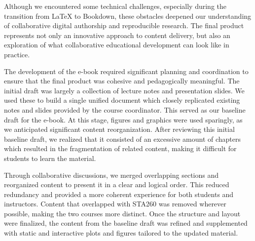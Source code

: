 \documentclass[11pt]{article}
\begin{document}
Although we encountered some technical challenges, especially during the transition from LaTeX to Bookdown, these obstacles deepened our understanding of collaborative digital authorship and reproducible research. The final product represents not only an innovative approach to content delivery, but also an exploration of what collaborative educational development can look like in practice.


The development of the e-book required significant planning and coordination to ensure that the final product was cohesive and pedagogically meaningful. The initial draft was largely a collection of lecture notes and presentation slides. 
We used these to build a single unified document which closely replicated existing notes and slides provided by the course coordinator.
This served as our baseline draft for the e-book.
At this stage, figures and graphics were used sparingly, as we anticipated significant content reorganization.
After reviewing this initial baseline draft, we realized that it consisted of an excessive amount of chapters which resulted in the fragmentation of related content, making it difficult for students to learn the material.


Through collaborative discussions, we merged overlapping sections and reorganized content to present it in a clear and logical order. 
This reduced redundancy and provided a more coherent experience for both students and instructors. 
Content that overlapped with STA260 was removed wherever possible, making the two courses more distinct. 
Once the structure and layout were finalized, the content from the baseline draft was refined and supplemented with static and interactive plots and figures tailored to the updated material.
\end{document}
